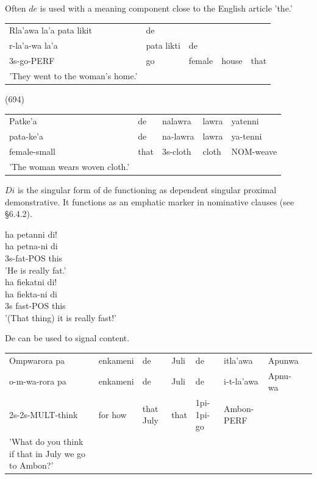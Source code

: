 \documentclass[10pt]{article}
\begin{document}
Often \(d e\) is used with a meaning component close to the English article 'the.'

\begin{center}
\begin{tabular}{lllll}
Rla'awa la'a pata likit & de &  &  &  \\
r-la'a-wa la'a & pata likti & de &  &  \\
3s-go-PERF & go & female & house & that \\
'They went to the woman's home.' &  &  &  &  \\
\end{tabular}
\end{center}

(694)

\begin{center}
\begin{tabular}{lllll}
Patke'a & de & nalawra & lawra & yatenni \\
pata-ke'a & de & na-lawra & lawra & ya-tenni \\
female-small & that & 3s-cloth & cloth & NOM-weave \\
'The woman wears woven cloth.' &  &  &  &  \\
\end{tabular}
\end{center}

\(D i\) is the singular form of de functioning as dependent singular proximal demonstrative. It functions as an emphatic marker in nominative clauses (see §6.4.2).

ha petanni di!\\
ha petna-ni di\\
3s-fat-POS this\\
'He is really fat.'\\
ha fiekatni di!\\
ha fiekta-ni di\\
3s fast-POS this\\
'(That thing) it is really fast!'

De can be used to signal content.

\begin{center}
\begin{tabular}{llllllll}
Ompwarora pa & enkameni & de & Juli & de & itla'awa & Apunwa \\
o-m-wa-rora pa & enkameni & de & Juli & de & i-t-la'awa & Apnu-wa \\
2s-2s-MULT-think & for how & that July & that & 1pi-1pi-go & Ambon-PERF &  \\
'What do you think if that in July we go to Ambon?' &  &  &  &  &  &  \\
\end{tabular}
\end{center}
\end{document}

